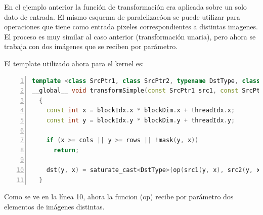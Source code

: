 \documentclass[a4paper,10pt]{report}
\begin{document}
En el ejemplo anterior la función de transformación era aplicada sobre un solo dato de entrada. 
El mismo esquema de paralelizacóon se puede utilizar para operaciones que tiene como entrada pixeles correspondientes a distintas imagenes. 
El proceso es muy similar al caso anterior (transformación unaria), pero ahora se trabaja con dos imágenes que se reciben por parámetro. 

El template utilizado ahora para el kernel es:
 
\begin{lstlisting}[frame=bt,title={aa},caption={modules/cudev/include/opencv2/cudev/grid/detail/transform.hpp},
columns=fullflexible,numbers=left,backgroundcolor=\color{LemonChiffon1},basicstyle=\footnotesize,keywordstyle=\ttfamily\footnotesize,language=C++,stringstyle=\ttfamily,breaklines=true,xleftmargin=0.5em,xrightmargin=0pt,aboveskip=\bigskipamount,belowskip=\bigskipamount]
template <class SrcPtr1, class SrcPtr2, typename DstType, class BinOp, class MaskPtr>
__global__ void transformSimple(const SrcPtr1 src1, const SrcPtr2 src2, GlobPtr<DstType> dst, const BinOp op, const MaskPtr mask, const int rows, const int cols)
  {
    const int x = blockIdx.x * blockDim.x + threadIdx.x;
    const int y = blockIdx.y * blockDim.y + threadIdx.y;

    if (x >= cols || y >= rows || !mask(y, x))
      return;

    dst(y, x) = saturate_cast<DstType>(op(src1(y, x), src2(y, x)));
  }
\end{lstlisting}



Como se ve en la línea 10, ahora la funcion (op) recibe por parámetro dos elementos de imágenes distintas.
\end{document}
